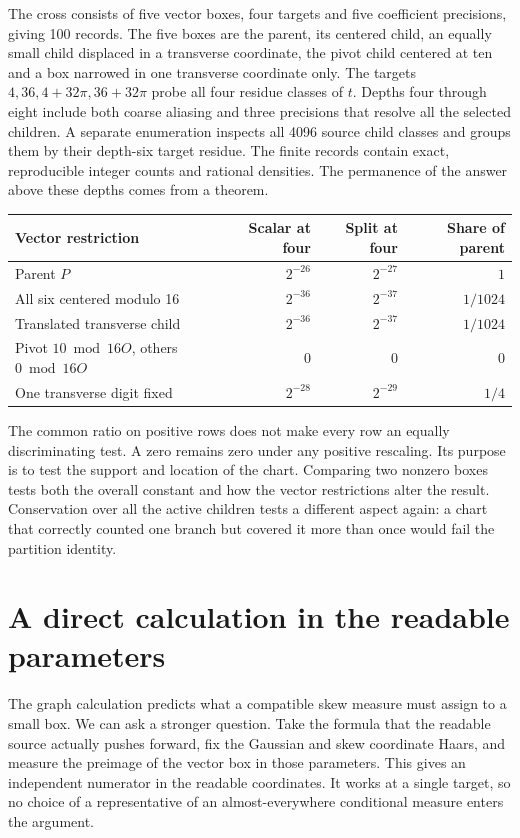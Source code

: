 \documentclass[12pt,letterpaper]{article}
\begin{document}
The cross consists of five vector boxes, four targets and five coefficient precisions, giving 100 records. The five boxes are the parent, its centered child, an equally small child displaced in a transverse coordinate, the pivot child centered at ten and a box narrowed in one transverse coordinate only. The targets $4,36,4+32\pi,36+32\pi$ probe all four residue classes of $t$. Depths four through eight include both coarse aliasing and three precisions that resolve all the selected children. A separate enumeration inspects all 4096 source child classes and groups them by their depth-six target residue. The finite records contain exact, reproducible integer counts and rational densities. The permanence of the answer above these depths comes from a theorem.

\begin{center}\small\begin{tabular}{@{}lrrr@{}}\toprule
Vector restriction & Scalar at four & Split at four & Share of parent\\\midrule
Parent $P$ & $2^{-26}$ & $2^{-27}$ & $1$\\
All six centered modulo 16 & $2^{-36}$ & $2^{-37}$ & $1/1024$\\
Translated transverse child & $2^{-36}$ & $2^{-37}$ & $1/1024$\\
Pivot $10\bmod16O$, others $0\bmod16O$ & $0$ & $0$ & $0$\\
One transverse digit fixed & $2^{-28}$ & $2^{-29}$ & $1/4$\\\bottomrule
\end{tabular}\end{center}
The common ratio on positive rows does not make every row an equally discriminating test. A zero remains zero under any positive rescaling. Its purpose is to test the support and location of the chart. Comparing two nonzero boxes tests both the overall constant and how the vector restrictions alter the result. Conservation over all the active children tests a different aspect again: a chart that correctly counted one branch but covered it more than once would fail the partition identity.

\section{A direct calculation in the readable parameters}
The graph calculation predicts what a compatible skew measure must assign to a small box. We can ask a stronger question. Take the formula that the readable source actually pushes forward, fix the Gaussian and skew coordinate Haars, and measure the preimage of the vector box in those parameters. This gives an independent numerator in the readable coordinates. It works at a single target, so no choice of a representative of an almost-everywhere conditional measure enters the argument.
\end{document}
